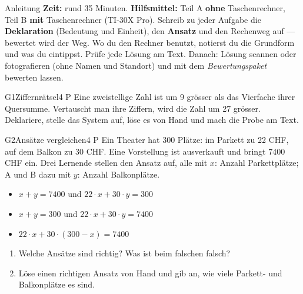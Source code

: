 \documentclass[11pt]{article}
\begin{document}

\begin{lpinfo}{Anleitung}
\textbf{Zeit:} rund 35 Minuten. \textbf{Hilfsmittel:} Teil A \textbf{ohne} Taschenrechner, Teil B \textbf{mit} Taschenrechner (TI-30X Pro).
Schreib zu jeder Aufgabe die \textbf{Deklaration} (Bedeutung und Einheit), den \textbf{Ansatz} und den Rechenweg auf — bewertet wird der Weg.
Wo du den Rechner benutzt, notierst du die Grundform und was du eintippst. Prüfe jede Lösung am Text.
Danach: Lösung scannen oder fotografieren (ohne Namen und Standort) und mit dem \emph{Bewertungspaket} bewerten lassen.
\end{lpinfo}


\begin{lpaufgabe}{G1}{Ziffernrätsel}{4 P}
Eine zweistellige Zahl ist um 9 grösser als das Vierfache ihrer Quersumme. Vertauscht man ihre Ziffern, wird die Zahl um 27 grösser.
Deklariere, stelle das System auf, löse es von Hand und mach die Probe am Text.
\end{lpaufgabe}

\begin{lpaufgabe}{G2}{Ansätze vergleichen}{4 P}
Ein Theater hat 300 Plätze: im Parkett zu 22 CHF, auf dem Balkon zu 30 CHF. Eine Vorstellung ist ausverkauft und bringt 7400 CHF ein.
Drei Lernende stellen den Ansatz auf, alle mit \(x\): Anzahl Parkettplätze; A und B dazu mit \(y\): Anzahl Balkonplätze.
\begin{itemize}[leftmargin=2.2em,itemsep=0pt]
\item[(A)] \(x + y = 7400\) und \(22 \cdot x + 30 \cdot y = 300\)
\item[(B)] \(x + y = 300\) und \(22 \cdot x + 30 \cdot y = 7400\)
\item[(C)] \(22 \cdot x + 30 \cdot (300 - x) = 7400\)
\end{itemize}
\begin{enumerate}[label=(\alph*),leftmargin=*,itemsep=1pt]
\item Welche Ansätze sind richtig? Was ist beim falschen falsch?
\item Löse einen richtigen Ansatz von Hand und gib an, wie viele Parkett- und Balkonplätze es sind.
\end{enumerate}
\end{lpaufgabe}
\end{document}
